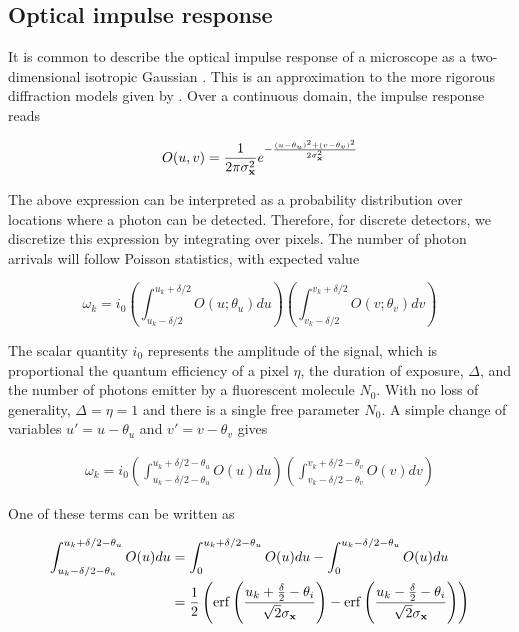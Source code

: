 \documentclass{article}
\begin{document}
\subsection{Optical impulse response}

It is common to describe the optical impulse response of a microscope as a two-dimensional isotropic Gaussian \citep{Zhang2007}. This is an approximation to the more rigorous diffraction models given by \citep{Richards1959,Gibson1989}. Over a continuous domain, the impulse response reads

\begin{equation*}
O(u,v) = \frac{1}{2\pi\sigma_{\bold{x}}^{2}}e^{-\frac{(u-\theta_{u})^{2}+(v-\theta_{v})^{2}}{2\sigma_{\bold{x}}^{2}}}
\end{equation*}

The above expression can be interpreted as a probability distribution over locations where a photon can be detected. Therefore, for discrete detectors, we discretize this expression by integrating over pixels. The number of photon arrivals will follow Poisson statistics, with expected value

\begin{equation*}
\omega_{k} = i_{0}\left(\int_{u_{k}-\delta /2}^{u_{k}+\delta /2} O(u; \theta_{u})du \right)\left(\int_{v_{k}-\delta /2}^{v_{k}+\delta /2} O(v;\theta_{v})dv \right)
\end{equation*}

The scalar quantity $i_{0}$ represents the amplitude of the signal, which is proportional the quantum efficiency of a pixel $\eta$, the duration of exposure, $\Delta$, and the number of photons emitter by a fluorescent molecule $N_{0}$. With no loss of generality, $\Delta = \eta = 1$ and there is a single free parameter $N_{0}$. A simple change of variables $u' = u - \theta_{u}$ and $v' = v-\theta_{v}$ gives

\begin{align*}
\omega_{k} = i_{0}\left(\int_{u_{k}-\delta /2 - \theta_{u}}^{u_{k}+\delta /2 - \theta_{u}} O(u)du \right)\left(\int_{v_{k}-\delta /2 - \theta_{v}}^{v_{k}+\delta /2 - \theta_{v}} O(v)dv \right)
\end{align*}

One of these terms can be written as 

\begin{align*}
\int_{u_{k}-\delta /2 - \theta_{u}}^{u_{k}+\delta /2 - \theta_{u}} O(u)du &= \int_{0}^{u_{k}+\delta /2 - \theta_{u}} O(u)du - \int_{0}^{u_{k}-\delta /2 - \theta_{u}} O(u)du\\
&= \frac{1}{2}\left(\mathrm{erf}\left(\frac{u_{k}+\frac{\delta}{2}-\theta_{i}}{\sqrt{2}\sigma_{\bold{x}}}\right) -\mathrm{erf}\left(\frac{u_{k}-\frac{\delta}{2}-\theta_{i}}{\sqrt{2}\sigma_{\bold{x}}}\right)\right)
\end{align*}
\end{document}
